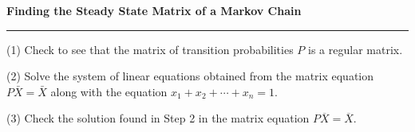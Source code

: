 \nopagenumbers
{\bf Finding the Steady State Matrix of a Markov Chain}
\vskip 1mm
\hrule

\vskip 6pt
(1) Check to see that the matrix of transition probabilities $P$ is a regular matrix.

\vskip 6pt
(2) Solve the system of linear equations obtained from the matrix equation $P\bar{X}=\bar{X}$ along with the equation $x_1+x_2+\cdots+x_n=1$.

\vskip 6pt
(3) Check the solution found in Step 2 in the matrix equation $P\overline{X}=\overline{X}$.


\vfill\eject
\bye
